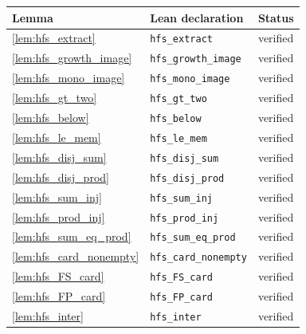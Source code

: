 \documentclass[11pt]{article}
\theoremstyle{definition}
\theoremstyle{remark}
\begin{document}
\begin{longtable}{@{}lll@{}}
\toprule
Lemma & Lean declaration & Status \\
\midrule
\endhead
\cref{lem:hfs_extract} & \texttt{hfs\_extract} & verified \\
\cref{lem:hfs_growth_image} & \texttt{hfs\_growth\_image} & verified \\
\cref{lem:hfs_mono_image} & \texttt{hfs\_mono\_image} & verified \\
\cref{lem:hfs_gt_two} & \texttt{hfs\_gt\_two} & verified \\
\cref{lem:hfs_below} & \texttt{hfs\_below} & verified \\
\cref{lem:hfs_le_mem} & \texttt{hfs\_le\_mem} & verified \\
\cref{lem:hfs_disj_sum} & \texttt{hfs\_disj\_sum} & verified \\
\cref{lem:hfs_disj_prod} & \texttt{hfs\_disj\_prod} & verified \\
\cref{lem:hfs_sum_inj} & \texttt{hfs\_sum\_inj} & verified \\
\cref{lem:hfs_prod_inj} & \texttt{hfs\_prod\_inj} & verified \\
\cref{lem:hfs_sum_eq_prod} & \texttt{hfs\_sum\_eq\_prod} & verified \\
\cref{lem:hfs_card_nonempty} & \texttt{hfs\_card\_nonempty} & verified \\
\cref{lem:hfs_FS_card} & \texttt{hfs\_FS\_card} & verified \\
\cref{lem:hfs_FP_card} & \texttt{hfs\_FP\_card} & verified \\
\cref{lem:hfs_inter} & \texttt{hfs\_inter} & verified \\
\bottomrule
\end{longtable}
\end{document}
